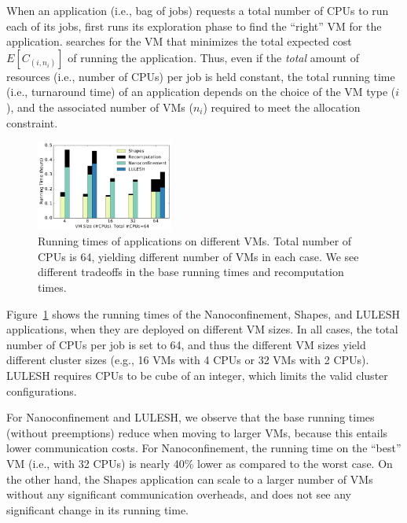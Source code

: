 When an application (i.e., bag of jobs) requests a total number of CPUs to run each of its jobs, \sysname first runs its exploration phase to find the ``right'' VM for the application.
\sysname searches for the VM that minimizes the total expected cost $E[C_{(i,n_i)}]$ of running the application. %
Thus, even if the \emph{total} amount of resources (i.e., number of CPUs) per job is held constant, the total running time (i.e., turnaround time) of an application depends on the choice of the VM type ($i$), and the associated number of VMs ($n_i$) required to meet the allocation constraint. %
%

\begin{figure}
  \centering
  \includegraphics[width=0.4\textwidth]{../graphs/runtime-bars.pdf}
      \vspace*{\myfigspace}
  \caption{Running times of applications on different VMs. Total number of CPUs is 64, yielding different number of VMs in each case. We see different tradeoffs in the base running times and recomputation times.}
  \label{fig:runtimes-bar}
    \vspace*{\myfigspace}
\end{figure}


Figure~\ref{fig:runtimes-bar} shows the running times of the Nanoconfinement, Shapes, and LULESH applications, when they are deployed on different VM sizes. 
In all cases, the total number of CPUs per job is set to 64, and thus the different VM sizes yield different cluster sizes (e.g., 16 VMs with 4 CPUs or 32 VMs with 2 CPUs).
LULESH requires CPUs to be cube of an integer, which limits the valid cluster configurations. 

For Nanoconfinement and LULESH, we observe that the base running times (without preemptions) reduce when moving to larger VMs, because this entails lower communication costs.
For Nanoconfinement, the running time on the ``best'' VM (i.e., with 32 CPUs) is nearly 40\% lower as compared to the worst case. 
On the other hand, the Shapes application can scale to a larger number of VMs without any significant communication overheads, and does not see any significant change in its running time. 

